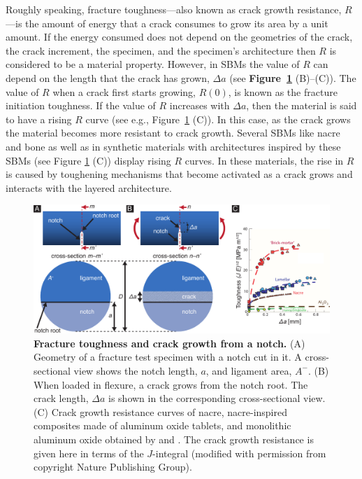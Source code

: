 \documentclass[12pt,onecolumn]{article}
\begin{document}
Roughly speaking, fracture toughness---also known as crack growth resistance, $R$---is the amount of energy that a crack consumes to grow its area by a unit amount. If the energy consumed does not depend on the geometries of the crack, the crack increment, the specimen, and the specimen's architecture then $R$ is considered to be a material property. However, in SBMs the value of $R$ can depend on the length that the crack has grown, $\Delta a$ (see {\bf Figure~\ref{fig:Rcurve}} (B)--(C)). The value of $R$ when a crack first starts growing, $R(0)$, is known as the fracture initiation toughness. If the value of $R$ increases with $\Delta a$, then the material is said to have a rising $R$ curve (see e.g., Figure~\ref{fig:Rcurve} (C)). 
%
In this case, as the crack grows the material becomes more resistant to crack growth. Several SBMs like nacre and bone  \cite{barthelat2007experimental,rabiei2010failure,nalla2005mechanistic,launey2009mechanistic} as well as in synthetic materials with architectures inspired by these SBMs (see Figure \ref{fig:Rcurve} (C)) \cite{ritchie2011conflicts} display rising $R$ curves. In these materials, the rise in $R$ is caused by toughening mechanisms that become activated as a crack grows and interacts with the layered architecture.
%
			\begin{figure}[ht!]
			\centering
			\includegraphics[width=\textwidth]{../Figures/FigureRcurve/Figure3a_V7.pdf}
			\caption{\textbf{Fracture toughness and crack growth from a notch.} (A) Geometry of a fracture test specimen with a notch cut in it. A cross-sectional view shows the notch length, $a$, and ligament area, $A^-$. (B) When loaded in flexure, a crack grows from the notch root. The crack length, $\Delta a$ is shown in the corresponding cross-sectional view. (C) Crack growth resistance curves of nacre, nacre-inspired composites made of aluminum oxide tablets, and monolithic aluminum oxide obtained by \cite{ritchie2011conflicts} and \cite{munch2008tough}. The crack growth resistance is given here in terms of the $J$-integral (modified with permission from \cite{ritchie2011conflicts} copyright Nature Publishing Group).}
			\label{fig:Rcurve}
			\end{figure}
\end{document}
